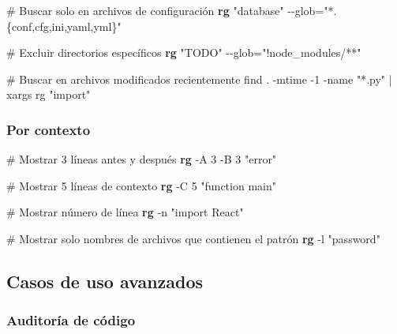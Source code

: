 \documentclass[
  11pt,
  letterpaper,
  oneside,
  openany]{scrbook}
\newenvironment{Shaded}{}{}
\newcommand{\AttributeTok}[1]{\textcolor[rgb]{0.84,0.23,0.29}{#1}}
\newcommand{\CommentTok}[1]{\textcolor[rgb]{0.42,0.45,0.49}{#1}}
\newcommand{\ExtensionTok}[1]{\textcolor[rgb]{0.84,0.23,0.29}{\textbf{#1}}}
\newcommand{\FunctionTok}[1]{\textcolor[rgb]{0.44,0.26,0.76}{#1}}
\newcommand{\KeywordTok}[1]{\textcolor[rgb]{0.84,0.23,0.29}{#1}}
\newcommand{\NormalTok}[1]{\textcolor[rgb]{0.14,0.16,0.18}{#1}}
\newcommand{\OperatorTok}[1]{\textcolor[rgb]{0.14,0.16,0.18}{#1}}
\newcommand{\StringTok}[1]{\textcolor[rgb]{0.01,0.18,0.38}{#1}}
\begin{document}
\begin{Shaded}
\begin{Highlighting}[]
\CommentTok{\# Buscar solo en archivos de configuración}
\ExtensionTok{rg} \StringTok{"database"} \AttributeTok{{-}{-}glob}\OperatorTok{=}\StringTok{"*.\{conf,cfg,ini,yaml,yml\}"}

\CommentTok{\# Excluir directorios específicos}
\ExtensionTok{rg} \StringTok{"TODO"} \AttributeTok{{-}{-}glob}\OperatorTok{=}\StringTok{"!node\_modules/**"}

\CommentTok{\# Buscar en archivos modificados recientemente}
\FunctionTok{find}\NormalTok{ . }\AttributeTok{{-}mtime} \AttributeTok{{-}1} \AttributeTok{{-}name} \StringTok{"*.py"} \KeywordTok{|} \FunctionTok{xargs}\NormalTok{ rg }\StringTok{"import"}
\end{Highlighting}
\end{Shaded}

\subsubsection{Por contexto}\label{por-contexto}

\begin{Shaded}
\begin{Highlighting}[]
\CommentTok{\# Mostrar 3 líneas antes y después}
\ExtensionTok{rg} \AttributeTok{{-}A}\NormalTok{ 3 }\AttributeTok{{-}B}\NormalTok{ 3 }\StringTok{"error"}

\CommentTok{\# Mostrar 5 líneas de contexto}
\ExtensionTok{rg} \AttributeTok{{-}C}\NormalTok{ 5 }\StringTok{"function main"}

\CommentTok{\# Mostrar número de línea}
\ExtensionTok{rg} \AttributeTok{{-}n} \StringTok{"import React"}

\CommentTok{\# Mostrar solo nombres de archivos que contienen el patrón}
\ExtensionTok{rg} \AttributeTok{{-}l} \StringTok{"password"}
\end{Highlighting}
\end{Shaded}

\subsection{Casos de uso avanzados}\label{casos-de-uso-avanzados-4}

\subsubsection{Auditoría de código}\label{auditoruxeda-de-cuxf3digo}
\end{document}
